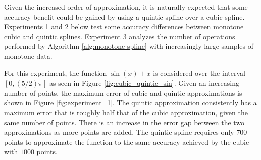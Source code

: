 

Given the increased order of approximation, it is naturally expected
that some accuracy benefit could be gained by using a quintic spline
over a cubic spline. Experiments 1 and 2 below test some accuracy
differences between monotone cubic and quintic splines. Experiment 3
analyzes the number of operations performed by Algorithm
\ref{alg:monotone-spline} with increasingly large samples of monotone
data.


For this experiment, the function $\sin(x) + x$ is considered over the
interval $[0,(5/2)\pi]$ as seen in Figure
\ref{fig:cubic_quintic_sin}. Given an increasing number of points, the
maximum error of cubic and quintic approximations is shown in Figure
\ref{fig:experiment_1}. The quintic approximation consistently has a
maximum error that is roughly half that of the cubic approximation,
given the same number of points. There is an increase in the error gap
between the two approximations as more points are added. The quintic
spline requires only $700$ points to approximate the function to the
same accuracy achieved by the cubic with $1000$ points.



